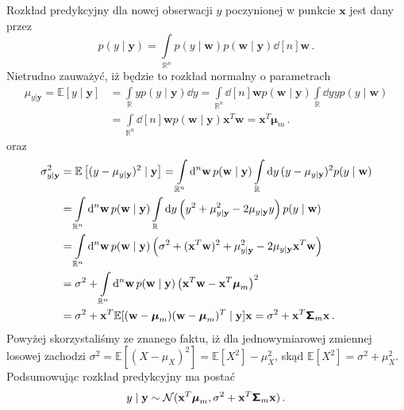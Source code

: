 \documentclass{myclass}
\begin{document}
Rozkład predykcyjny dla nowej obserwacji \(y\) poczynionej w punkcie \(\mathbf{x}\) jest dany przez
\begin{equation*}
    p(y \mid \mathbf{y}) = \int\limits_{\mathbb{R}^n}p(y\mid\mathbf{w})p(\mathbf{w}\mid\mathbf{y}) \dd[n]\mathbf{w}\,.
\end{equation*}
Nietrudno zauważyć, iż będzie to rozkład normalny o parametrach
\begin{equation*}
    \begin{split}
        \mu_{y|\mathbf{y}} = \mathbb{E}[y\mid\mathbf{y}] &= \int\limits_{\mathbb{R}} y p(y\mid\mathbf{y}) \dd{y} = \int\limits_{\mathbb{R}^n}\dd[n]{\mathbf{w}} p(\mathbf{w}\mid\mathbf{y}) \int\limits_\mathbb{R}\dd{y} yp(y\mid\mathbf{w}) \\
        &= \int\limits_{\mathbb{R}^n}\dd[n]{\mathbf{w}} p(\mathbf{w}\mid\mathbf{y}) \mathbf{x}^T\mathbf{w} = \mathbf{x}^T\boldsymbol{\mu}_m\,.
    \end{split}
\end{equation*}
oraz
\begin{equation*}
    \begin{split}
        \sigma_{y|\mathbf{y}}^2 &= \mathbb{E}\left[(y - \mu_{y|\mathbf{y}} )^2 \mid \mathbf{y}\right] = \int\limits_{\mathbb{R}^n}\dd[n]{\mathbf{w}} p(\mathbf{w}\mid\mathbf{y}) \int\limits_\mathbb{R}\dd{y} (y-\mu_{y|\mathbf{y}})^2p(y\mid\mathbf{w})\\
        &= \int\limits_{\mathbb{R}^n}\dd[n]{\mathbf{w}} p(\mathbf{w}\mid\mathbf{y}) \int\limits_\mathbb{R}\dd{y} \left(y^2 + \mu_{y|\mathbf{y}}^2 - 2\mu_{y|\mathbf{y}}y\right)p(y\mid\mathbf{w})\\
        &= \int\limits_{\mathbb{R}^n}\dd[n]{\mathbf{w}} p(\mathbf{w}\mid\mathbf{y}) \left(\sigma^2 + (\mathbf{x}^T\mathbf{w})^2 + \mu_{y|\mathbf{y}}^2 - 2\mu_{y|\mathbf{y}}\mathbf{x}^T\mathbf{w}\right)\\
        &=\sigma^2 + \int\limits_{\mathbb{R}^n}\dd[n]{\mathbf{w}} p(\mathbf{w}\mid\mathbf{y}) \left(\mathbf{x}^T\mathbf{w} - \mathbf{x}^T\boldsymbol{\mu}_m\right)^2\\
        &=\sigma^2 + \mathbf{x}^T \mathbb{E}[(\mathbf{w}-\boldsymbol{\mu}_m)(\mathbf{w}-\boldsymbol{\mu}_m)^T\mid\mathbf{y}]\mathbf{x} = \sigma^2 +\mathbf{x}^T\boldsymbol{\mathsf{\Sigma}}_m\mathbf{x}\,.
    \end{split}
\end{equation*}
Powyżej skorzystaliśmy ze znanego faktu, iż dla jednowymiarowej zmiennej losowej zachodzi \(\sigma^2
= \mathbb{E}[(X - \mu_X)^2] = \mathbb{E}[X^2] - \mu_X^2\), skąd \(\mathbb{E}[X^2] = \sigma^2 +
\mu_X^2\). Podsumowując rozkład predykcyjny ma postać
\begin{equation*}
    y \mid \mathbf{y} \sim \mathcal{N}(\mathbf{x}^T\boldsymbol{\mu}_m, \sigma^2 + \mathbf{x}^T\boldsymbol{\mathsf{\Sigma}}_m\mathbf{x})\,.
\end{equation*}
\end{document}
